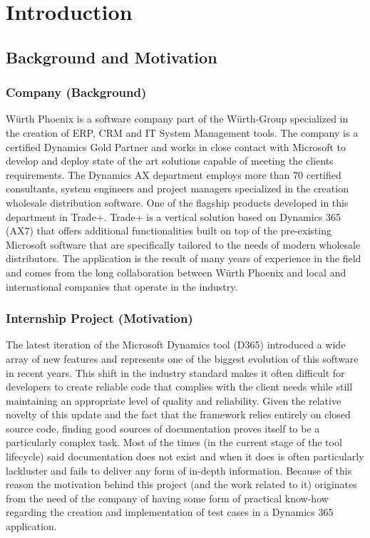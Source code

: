 \chapter{Introduction}

\section{Background and Motivation} 

\subsection{Company (Background)}
Würth Phoenix is a software company part of the Würth-Group specialized in the creation of ERP, CRM and IT System Management tools. The company is a certified Dynamics Gold Partner and works in close contact with Microsoft to develop and deploy state of the art solutions capable of meeting the clients requirements. The Dynamics AX department employs more than 70 certified consultants, system engineers and project managers specialized in the creation wholesale distribution software. One of the flagship products developed in this department in Trade+. Trade+ is a vertical solution based on Dynamics 365 (AX7) that offers additional functionalities built on top of the pre-existing Microsoft software that are specifically tailored to the needs of modern wholesale distributors. The application is the result of many years of experience in the field and comes from the long collaboration between Würth Phoenix and local and international companies that operate in the industry.

\subsection{Internship Project (Motivation)}
The latest iteration of the Microsoft Dynamics tool (D365) introduced a wide array of new features and represents one of the biggest evolution of this software in recent years. This shift in the industry standard makes it often difficult for developers to create reliable code that complies with the client needs while still maintaining an appropriate level of quality and reliability. Given the relative novelty of this update and the fact that the framework relies entirely on closed source code, finding good sources of documentation proves itself to be a particularly complex task. Most of the times (in the current stage of the tool lifecycle) said documentation does not exist and when it does is often particularly lackluster and fails to deliver any form of in-depth information. Because of this reason the motivation behind this project (and the work related to it) originates from the need of the company of having some form of practical know-how regarding the creation and implementation of test cases in a Dynamics 365 application.

